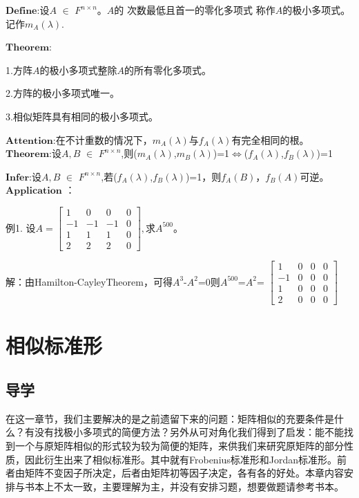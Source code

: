 \documentclass[a4paper,12pt]{book}
\begin{document}
$\mathbf{Define}$:设$\mathit{A}$ $\in$ $\mathit{F^{n\times n} }$。$\mathit{A}$的
{\color{red}次数最低且首一的零化多项式 }称作$\mathit{A}$的极小多项式。记作$m_{\mathit{A}}(\lambda).$

$\mathbf{Theorem}$:

1.方阵$\mathit{A}$的极小多项式整除$\mathit{A}$的所有零化多项式。

2.方阵的极小多项式唯一。

3.相似矩阵具有相同的极小多项式。

$\mathbf{Attention}$:在不计重数的情况下，$m_{\mathit{A}}(\lambda)$与$f_{\mathit{A}}(\lambda)$有完全相同的根。~\\

$\mathbf{Theorem}$:设$\mathit{A,B}$ $\in$ $\mathit{F^{n\times n} }$,则($m_{\mathit{A}}(\lambda)$,$m_{\mathit{B}}(\lambda)$)=1$\Leftrightarrow $($f_{\mathit{A}}(\lambda)$,$f_{\mathit{B}}(\lambda)$)=1

$\mathbf{Infer}$:设$\mathit{A,B}$ $\in$ $\mathit{F^{n\times n} }$,若($f_{\mathit{A}}(\lambda)$,$f_{\mathit{B}}(\lambda)$)=1，则$f_{\mathit{A}}(B)$，$f_{\mathit{B}}(A)$可逆。~\\

$\mathbf{Application}$ ：

例1. 设$\mathit{A}=
\begin{bmatrix}
	1&  0&  0& 0\\
	-1&  -1&-1  &0 \\
	1&  1&  1& 0\\
	2&2  &2  &0
\end{bmatrix},
$求$\mathit{A}^{500}$。

解：由Hamilton-CayleyTheorem，可得$\mathit{A}^{3}$-$\mathit{A}^{2}$=0则$\mathit{A}^{500}$=$\mathit{A}^{2}$=
$\begin{bmatrix}
	1&  0&  0& 0\\
	-1&  0&0  &0 \\
	1&  0&  0& 0\\
	2&0  &0  &0
\end{bmatrix}$

\chapter{相似标准形}
\section{导学}

在这一章节，我们主要解决的是之前遗留下来的问题：矩阵相似的充要条件是什么？有没有找极小多项式的简便方法？另外从可对角化我们得到了启发：能不能找到一个与原矩阵相似的形式较为较为简便的矩阵，来供我们来研究原矩阵的部分性质，因此衍生出来了相似标准形。其中就有Frobenius标准形和Jordan标准形。前者由矩阵不变因子所决定，后者由矩阵初等因子决定，各有各的好处。本章内容安排与书本上不太一致，主要理解为主，并没有安排习题，想要做题请参考书本。~\\
\end{document}
